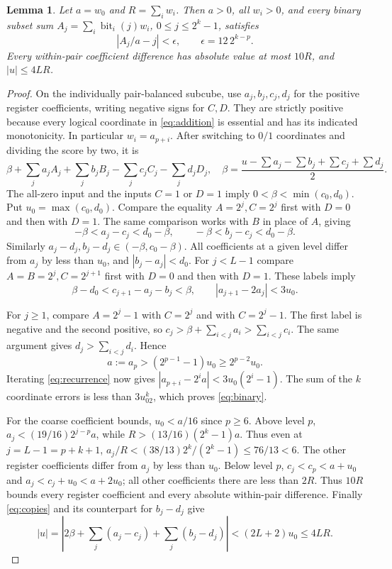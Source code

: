 \documentclass[11pt]{article}
\newtheorem{lemma}[theorem]{Lemma}
\begin{document}
\begin{lemma}\label{lem:pinning}
Let $a=w_0$ and $R=\sum_iw_i$. Then $a>0$, all $w_i>0$, and every binary
subset sum $A_j=\sum_i\operatorname{bit}_i(j)w_i$, $0\le j\le2^k-1$,
satisfies
\begin{equation}\label{eq:binary}
 \left|A_j/a-j\right|<\epsilon,
 \qquad \epsilon=12\,2^{k-p}.
\end{equation}
Every within-pair coefficient difference has absolute value at most
$10R$, and $|u|\le4LR$.
\end{lemma}
\begin{proof}
On the individually pair-balanced subcube, use $a_j,b_j,c_j,d_j$ for
the positive register coefficients, writing negative signs for $C,D$.
They are strictly positive because every logical coordinate in
\eqref{eq:addition} is essential and has its indicated monotonicity.
In particular $w_i=a_{p+i}$. After switching to $0/1$ coordinates and
dividing the score by two, it is
\[
 \beta+\sum_j a_jA_j+\sum_j b_jB_j-\sum_jc_jC_j-\sum_jd_jD_j,
 \quad
 \beta=\frac{u-\sum a_j-\sum b_j+\sum c_j+\sum d_j}{2}.
\]
The all-zero input and the inputs $C=1$ or $D=1$ imply
$0<\beta<\min(c_0,d_0)$. Put $u_0=\max(c_0,d_0)$.
Compare the equality $A=2^j,C=2^j$ first with $D=0$ and then with $D=1$.
The same comparison works with $B$ in place of $A$, giving
\begin{equation}\label{eq:copies}
 -\beta<a_j-c_j<d_0-\beta,
 \qquad -\beta<b_j-c_j<d_0-\beta.
\end{equation}
Similarly $a_j-d_j,b_j-d_j\in(-\beta,c_0-\beta)$.
All coefficients at a given level differ from $a_j$ by less than $u_0$,
and $|b_j-a_j|<d_0$.
For $j<L-1$ compare $A=B=2^j,C=2^{j+1}$ first with $D=0$ and then
with $D=1$. These labels imply
\begin{equation}\label{eq:recurrence}
 \beta-d_0<c_{j+1}-a_j-b_j<\beta,
 \qquad |a_{j+1}-2a_j|<3u_0.
\end{equation}

For $j\ge1$, compare $A=2^j-1$ with $C=2^j$ and with $C=2^j-1$.
The first label is negative and the second positive, so
$c_j>\beta+\sum_{i<j}a_i>\sum_{i<j}c_i$.
The same argument gives $d_j>\sum_{i<j}d_i$. Hence
\[
 a:=a_p>(2^{p-1}-1)u_0\ge2^{p-2}u_0.
\]
Iterating \eqref{eq:recurrence} now gives
$|a_{p+i}-2^ia|<3u_0(2^i-1)$.
The sum of the $k$ coordinate errors is less than $3u_02^k$, which
proves \eqref{eq:binary}.

For the coarse coefficient bounds, $u_0<a/16$ since $p\ge6$.
Above level $p$, $a_j<(19/16)2^{j-p}a$, while
$R>(13/16)(2^k-1)a$. Thus even at $j=L-1=p+k+1$,
$a_j/R<(38/13)2^k/(2^k-1)\le76/13<6$.
The other register coefficients differ from $a_j$ by less than $u_0$.
Below level $p$, $c_j<c_p<a+u_0$ and
$a_j<c_j+u_0<a+2u_0$; all other coefficients there are less than $2R$.
Thus $10R$ bounds every register coefficient and every absolute
within-pair difference. Finally \eqref{eq:copies} and its counterpart
for $b_j-d_j$ give
\[
 |u|=\left|2\beta+\sum_j(a_j-c_j)+\sum_j(b_j-d_j)\right|
 <(2L+2)u_0\le4LR.
\]
\end{proof}
\end{document}

